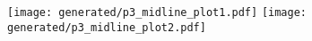 \documentclass[border=0in]{standalone}
\begin{document}
\texttt{[image: generated/p3\_midline\_plot1.pdf]}
\texttt{[image: generated/p3\_midline\_plot2.pdf]}
\end{document}

